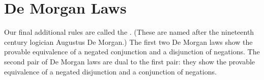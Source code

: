 \section{De Morgan Laws}
Our final additional rules are called the . (These are named after the nineteenth century logician Augustus De Morgan.) The first two De Morgan laws show the provable equivalence of a negated conjunction and a disjunction of negations.
The second pair of De Morgan laws are dual to the first pair: they show the provable equivalence of a negated disjunction and a conjunction of negations.

